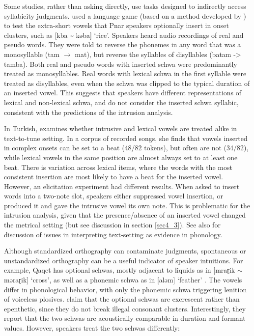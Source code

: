 \documentclass[output=paper,colorlinks,citecolor=brown]{langscibook}
\begin{document}
Some studies, rather than asking directly, use tasks designed to indirectly access syllabicity judgments. \citet{ring2014intrusive} used a language game (based on a method developed by \cite{van1999facilitatory}) to test the extra-short vowels that Pnar speakers optionally insert in onset clusters, such as [kba {\textasciitilde} kəba] ‘rice’. Speakers heard audio recordings of real and pseudo words. They were told to reverse the phonemes in any word that was a monosyllable (tam $\rightarrow$ mat), but reverse the syllables of disyllables (batam -> tamba). Both real and pseudo words with inserted schwa were predominantly treated as monosyllables. Real words with lexical schwa in the first syllable were treated as disyllables, even when the schwa was clipped to the typical duration of an inserted vowel. This suggests that speakers have different representations of lexical and non-lexical schwa, and do not consider the inserted schwa syllabic, consistent with the predictions of the intrusion analysis.  

In Turkish, \citet{Bellik2019a} examines whether intrusive and lexical vowels are treated alike in text-to-tune setting. In a corpus of recorded songs, she finds that vowels inserted in complex onsets can be set to a beat (48/82 tokens), but often are not (34/82), while lexical vowels in the same position are almost always set to at least one beat. There is variation across lexical items, where the words with the most consistent insertion are most likely to have a beat for the inserted vowel. However, an elicitation experiment had different results. When asked to insert words into a two-note slot, speakers either suppressed vowel insertion, or produced it and gave the intrusive vowel its own note. This is problematic for the intrusion analysis, given that the presence/absence of an inserted vowel changed the metrical setting (but see discussion in section \ref{sec4_3}). See also  for discussion of issues in interpreting text-setting as evidence in phonology. 

Although standardized orthography can contaminate judgments, spontaneous or unstandardized orthography can be a useful indicator of speaker intuitions. For example, Qaqet has optional schwas, mostly adjacent to liquids as in [mraɽik ${\sim}$ məraɽik] ‘cross’, as well as a phonemic schwa as in [aləm] ‘feather’ \citep{tabain2022qaqet}. The vowels differ in phonological behavior, with only the phonemic schwa triggering lenition of voiceless plosives. \citet{tabain2022qaqet} claim that the optional schwas are excrescent rather than epenthetic, since they do not break illegal consonant clusters. Interestingly, they report that the two schwas are acoustically comparable in duration and formant values. However, speakers treat the two schwas differently: 
\end{document}
